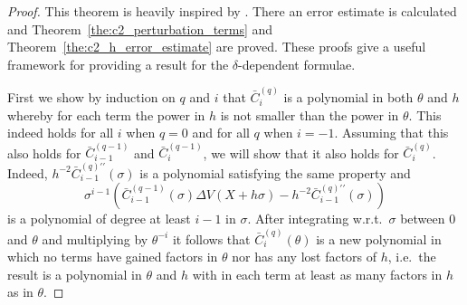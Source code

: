 \begin{proof}
    This theorem is heavily inspired by \cite{ixaru_cp_1998}. There an error estimate is calculated and Theorem~\ref{the:c2_perturbation_terms} and Theorem~\ref{the:c2_h_error_estimate} are proved. These proofs give a useful framework for providing a result for the $\delta$-dependent formulae.


    First we show by induction on $q$ and $i$ that $\bar{C}_{i}^{(q)}$ is a polynomial in both $\theta$ and $h$ whereby for each term the power in $h$ is not smaller than the power in $\theta$. This indeed holds for all $i$ when $q=0$ and for all $q$ when $i=-1$.
    Assuming that this also holds for $\bar{C}_{i-1}^{(q-1)}$ and $\bar{C}_{i}^{(q-1)}$, we will show that it also holds for $\bar{C}_{i}^{(q)}$. Indeed,
    $h^{-2}\bar{C}_{i-1}^{(q)\prime\prime}(\sigma)$ is a polynomial satisfying the same property and
    $$
        \sigma^{i-1} \left(
        \bar{C}_{i-1}^{(q-1)}(\sigma) \Delta V(X+h\sigma) - h^{-2} \bar{C}_{i-1}^{(q)\prime\prime}(\sigma)
        \right)
    $$
    is a polynomial of degree at least $i-1$ in $\sigma$. After integrating w.r.t.\ $\sigma$ between $0$ and $\theta$ and multiplying by $\theta^{-i}$
    it follows that $\bar{C}_{i}^{(q)}(\theta)$ is a new polynomial in which no terms have gained factors in $\theta$ nor has any lost factors of $h$, i.e.\
    the result is a polynomial in $\theta$ and $h$ with in each term at least as many factors in $h$ as in $\theta$.


\end{proof}
